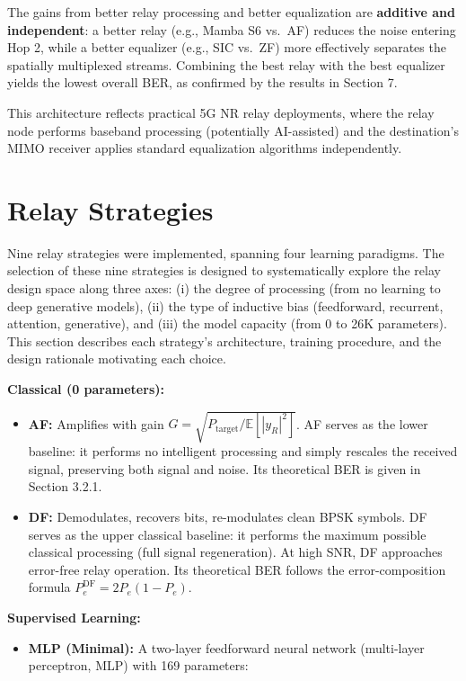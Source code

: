 The gains from better relay processing and better equalization are \textbf{additive and independent}: a better relay (e.g., Mamba S6 vs.~AF) reduces the noise entering Hop 2, while a better equalizer (e.g., SIC vs.~ZF) more effectively separates the spatially multiplexed streams. Combining the best relay with the best equalizer yields the lowest overall BER, as confirmed by the results in Section 7.

This architecture reflects practical 5G NR relay deployments, where the relay node performs baseband processing (potentially AI-assisted) and the destination's MIMO receiver applies standard equalization algorithms independently.

\section{Relay Strategies}\label{sec:relay-strategies}

Nine relay strategies were implemented, spanning four learning paradigms. The selection of these nine strategies is designed to systematically explore the relay design space along three axes: (i) the degree of processing (from no learning to deep generative models), (ii) the type of inductive bias (feedforward, recurrent, attention, generative), and (iii) the model capacity (from 0 to 26K parameters). This section describes each strategy's architecture, training procedure, and the design rationale motivating each choice.

\textbf{Classical (0 parameters):}

\begin{itemize}
\item
  \textbf{AF:} Amplifies with gain \(G = \sqrt{P_{\text{target}} / \mathbb{E}[|y_R|^2]}\). AF serves as the lower baseline: it performs no intelligent processing and simply rescales the received signal, preserving both signal and noise. Its theoretical BER is given in Section 3.2.1.
\item
  \textbf{DF:} Demodulates, recovers bits, re-modulates clean BPSK symbols. DF serves as the upper classical baseline: it performs the maximum possible classical processing (full signal regeneration). At high SNR, DF approaches error-free relay operation. Its theoretical BER follows the error-composition formula \(P_e^{\text{DF}} = 2P_e(1-P_e)\).
\end{itemize}

\textbf{Supervised Learning:}

\begin{itemize}
\tightlist
\item
  \textbf{MLP (Minimal):} A two-layer feedforward neural network (multi-layer perceptron, MLP) with 169 parameters:
\end{itemize}

